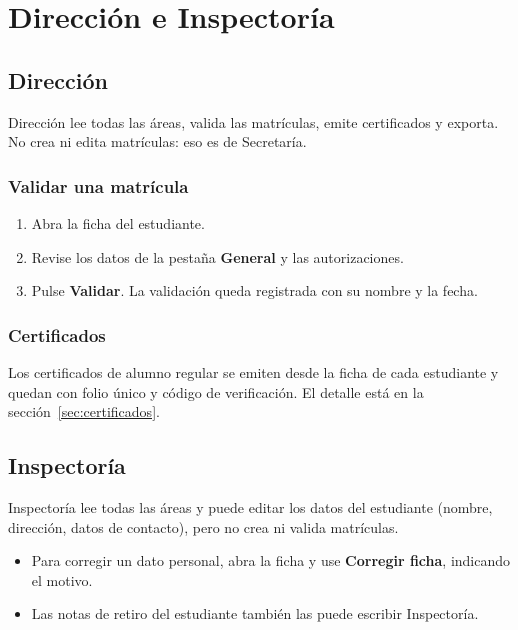 \section{Dirección e Inspectoría}

\subsection{Dirección}

Dirección lee todas las áreas, valida las matrículas, emite certificados y
exporta. No crea ni edita matrículas: eso es de Secretaría.

\subsubsection{Validar una matrícula}

\begin{enumerate}[leftmargin=*,itemsep=0.2em]
\item Abra la ficha del estudiante.
\item Revise los datos de la pestaña \textbf{General} y las autorizaciones.
\item Pulse \textbf{Validar}. La validación queda registrada con su nombre y
  la fecha.
\end{enumerate}

\subsubsection{Certificados}

Los certificados de alumno regular se emiten desde la ficha de cada estudiante
y quedan con folio único y código de verificación. El detalle está en la
sección~\ref{sec:certificados}.

\subsection{Inspectoría}

Inspectoría lee todas las áreas y puede editar los datos del estudiante
(nombre, dirección, datos de contacto), pero no crea ni valida matrículas.

\begin{itemize}[leftmargin=*,itemsep=0.2em]
\item Para corregir un dato personal, abra la ficha y use
  \textbf{Corregir ficha}, indicando el motivo.
\item Las notas de retiro del estudiante también las puede escribir
  Inspectoría.
\end{itemize}
